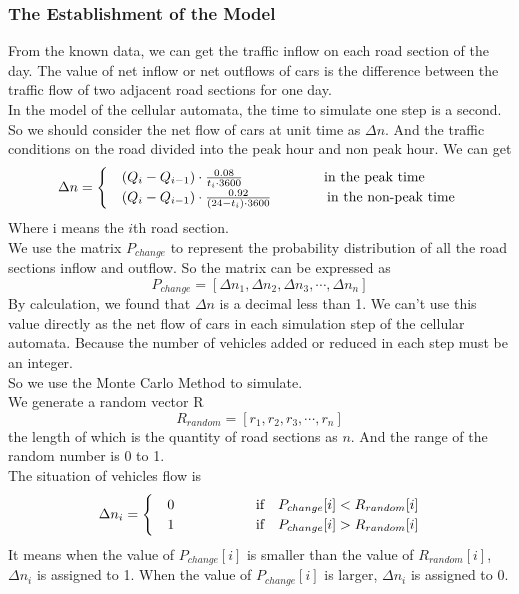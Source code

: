 \documentclass[UTF8]{mcmthesis}
\begin{document}
\subsubsection{The Establishment of the Model}
\indent From the known data, we can get the traffic inflow on each road section of the day. The value of net inflow or net outflows of cars is the difference between the traffic flow of two adjacent road sections for one day.\\
\indent In the model of the cellular automata, the time to simulate one step is a second. So we should consider the net flow of cars at unit time as $\Delta n$. And the traffic conditions on the road divided into the peak hour and non peak hour. We can get
\begin{equation}
	\Delta n=\begin{cases}
	&(Q_{i}-Q_{i-1})\cdot \frac{0.08}{t_{i}\cdot 3600} \indent\indent \indent\quad\text{\,\,in the peak time }\\ 
	&(Q_{i}-Q_{i-1})\cdot \frac{0.92}{(24-t_{i})\cdot 3600}\indent\indent \quad\text{in the non-peak time } 
	\end{cases}
\end{equation}
\indent Where i means the $i$th road section. \\
\indent We use the matrix $P_{change}$ to represent the probability distribution of all the road sections inflow and outflow. So the matrix can be expressed as
\begin{equation}
	P_{change}=[\Delta n_1, \Delta n_2,\Delta n_3,\cdots, \Delta n_n]
\end{equation}
\indent By calculation, we found that $\Delta n$ is a decimal less than 1. We can't use this value directly as the net flow of cars in each simulation step of the cellular automata. Because the number of vehicles added or reduced in each step must be an integer.\\
\indent So we use the Monte Carlo Method to simulate.\\
\indent We generate a random vector R\\
\begin{equation}
	R_{random}=[r_1, r_2,r_3,\cdots, r_n]
\end{equation}
\indent the length of which is the quantity of road sections as $n$. And the range of the random number is 0 to 1.\\
\indent The situation of vehicles flow is 
\begin{equation}
	\Delta n_{i}=\begin{cases}
	&0 \indent\indent\indent \quad\text{\,\,if \,\, $P_{change}[i] < R_{random}[i]$}\\ 
	&1 \indent\indent\indent \quad\text{\,\,if \,\, $P_{change}[i] > R_{random}[i]$} 
	\end{cases}
\end{equation}
\indent It means when the value of $P_{change}[i]$ is smaller than the value of $R_{random}[i]$, $\Delta n_{i}$ is assigned to 1. When the value of $P_{change}[i]$ is larger,  $\Delta n_{i}$ is assigned to 0.
\end{document}
